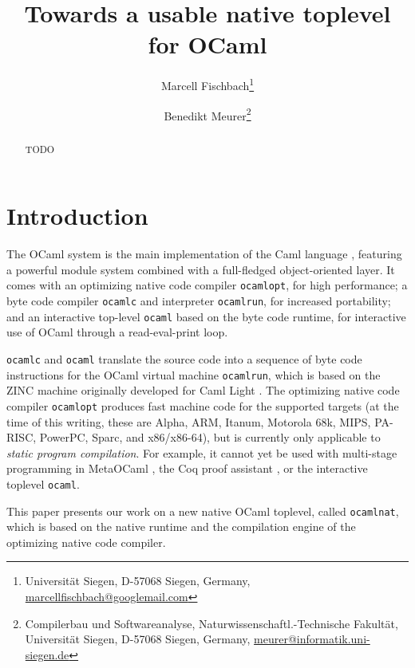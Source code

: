 \documentclass[10pt,a4paper,draft,twocolumn]{article}
\begin{document}
\title{%
  Towards a usable native toplevel for OCaml
}
\author{%
  Marcell Fischbach\thanks{
    Universit\"at Siegen,
    D-57068 Siegen,
    Germany,
    \url{marcellfischbach@googlemail.com}
  }
  \and
  Benedikt Meurer\thanks{
    Compilerbau und Softwareanalyse,
    Naturwissenschaftl.-Technische Fakult\"at,
    Universit\"at Siegen,
    D-57068 Siegen,
    Germany,
    \url{meurer@informatik.uni-siegen.de}
  }
}
\date{}

\maketitle

\begin{abstract}
  TODO
\end{abstract}


\section{Introduction}

The OCaml \cite{Leroy11,Remy02} system is the main implementation of the Caml
language \cite{Caml11}, featuring a powerful module system
combined with a full-fledged object-oriented layer. It comes with an optimizing native
code compiler \texttt{ocamlopt}, for high performance; a byte code compiler \texttt{ocamlc}
and interpreter \texttt{ocamlrun}, for increased portability; and an interactive top-level
\texttt{ocaml} based on the byte code runtime, for interactive use of OCaml through a
read-eval-print loop.

\texttt{ocamlc} and \texttt{ocaml} translate the source code into a sequence of byte code
instructions for the OCaml virtual machine \texttt{ocamlrun}, which is based on the ZINC
machine \cite{Leroy90} originally developed for Caml Light \cite{Leroy02}. The optimizing
native code compiler \texttt{ocamlopt} produces fast machine code for the supported targets
(at the time of this writing, these are Alpha, ARM, Itanum, Motorola 68k, MIPS, PA-RISC, PowerPC,
Sparc, and x86/x86-64), but is currently only applicable to \emph{static program compilation}.
For example, it cannot yet be used with multi-stage programming in MetaOCaml \cite{Taha03,Taha06},
the Coq proof assistant \cite{Bertot04,Coq10}, or the interactive toplevel \texttt{ocaml}.

This paper presents our work on a new native OCaml toplevel, called \texttt{ocamlnat}, which is
based on the native runtime and the compilation engine of the optimizing native code compiler.
\end{document}

